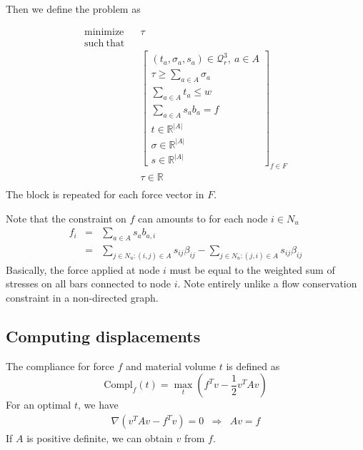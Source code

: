 \documentclass{article}
\begin{document}
Then we define the problem as 

\begin{eqnarray}
    \mathrm{minimize} &&  \tau \\
    \mathrm{such\ that} \\
    && \left[
        \begin{array}{l}
            (t_a,\sigma_a,s_a)\in\mathcal{Q}^3_r,\ a\in A\\
            \displaystyle \tau \geq \sum_{a\in A} \sigma_a \\
            \displaystyle \sum_{a\in A} t_a \leq w \\
            \displaystyle \sum_{a\in A} s_a b_a = f \\
            t\in\mathbb{R}^{|A|}\\
            \sigma\in\mathbb{R}^{|A|} \\
            s\in\mathbb{R}^{|A|} 
        \end{array}
    \right]_{f\in F} \\
    && \tau\in\mathbb{R}\\
\end{eqnarray}
The block is repeated for each force vector in $F$.

Note that the constraint on $f$ can amounts to for each node $i\in N_u$
\begin{eqnarray}
    f_i & = & \sum_{a\in A} s_{a} b_{a,i} \\
        & = & \sum_{j\in N_u:(i,j)\in A} s_{ij} \beta_{ij} 
            - \sum_{j\in N_u:(j,i)\in A} s_{ij} \beta_{ij}
\end{eqnarray}
Basically, the force applied at node $i$ must be equal to the weighted sum of
stresses on all bars connected to node $i$. Note entirely unlike a flow
conservation constraint in a non-directed graph.


\subsection{Computing displacements}
The compliance for force $f$ and material volume $t$ is defined as 
\[
    \mathrm{Compl}_f(t) = \max_t \left(f^Tv  - \frac{1}{2} v^TAv\right)
\]
For an optimal $t$, we have 
\begin{eqnarray}
    \nabla (v^TAv-f^Tv) = 0 & \Rightarrow & Av=f
\end{eqnarray}
If $A$ is positive definite, we can obtain $v$ from $f$.
\end{document}
